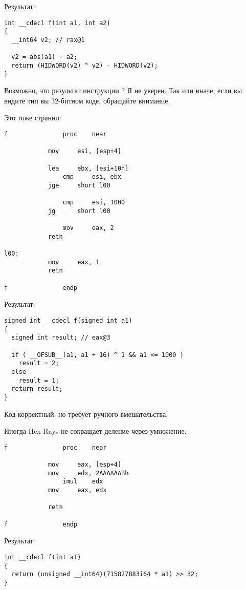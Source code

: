 Результат:

\begin{lstlisting}
int __cdecl f(int a1, int a2)
{
  __int64 v2; // rax@1

  v2 = abs(a1) - a2;
  return (HIDWORD(v2) ^ v2) - HIDWORD(v2);
}
\end{lstlisting}

Возможно, это результат инструкции ? Я не уверен.
Так или иначе, если вы видите тип  вы 32-битном коде, обращайте внимание.

Это тоже странно:

\begin{lstlisting}
f               proc    near

	        mov     esi, [esp+4]

        	lea     ebx, [esi+10h]
                cmp     esi, ebx
	        jge     short l00

                cmp     esi, 1000
	        jg      short l00

                mov     eax, 2
	        retn

l00:
	        mov     eax, 1
        	retn

f               endp
\end{lstlisting}

Результат:

\begin{lstlisting}
signed int __cdecl f(signed int a1)
{
  signed int result; // eax@3

  if ( __OFSUB__(a1, a1 + 16) ^ 1 && a1 <= 1000 )
    result = 2;
  else
    result = 1;
  return result;
}
\end{lstlisting}

Код корректный, но требует ручного вмешательства.

Иногда Hex-Rays не сокращает деление через умножение:

\begin{lstlisting}
f               proc    near

        	mov     eax, [esp+4]
	        mov     edx, 2AAAAAABh
                imul    edx
        	mov     eax, edx

	        retn

f               endp
\end{lstlisting}

Результат:

\begin{lstlisting}
int __cdecl f(int a1)
{
  return (unsigned __int64)(715827883i64 * a1) >> 32;
}
\end{lstlisting}

